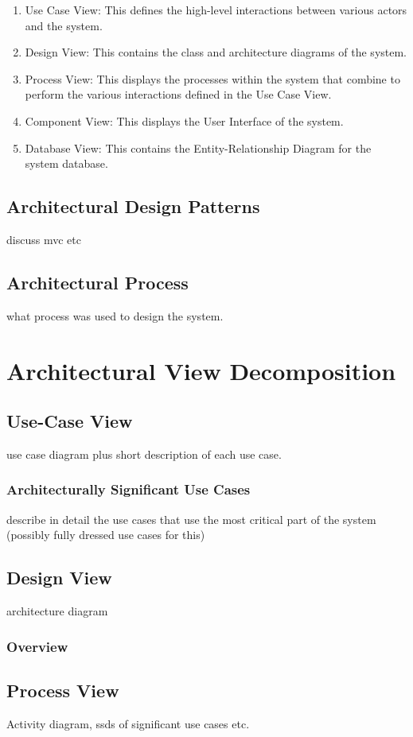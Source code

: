 \documentclass[11pt]{article}
\begin{document}
\begin{enumerate}
	\item Use Case View: This defines the high-level interactions between various actors and the system.
	\item Design View: This contains the class and architecture diagrams of the system.
	\item Process View: This displays the processes within the system that combine to perform the various interactions defined in the Use Case View.
	\item Component View: This displays the User Interface of the system.
	\item Database View: This contains the Entity-Relationship Diagram for the system database.
\end{enumerate} 
\subsection{Architectural Design Patterns}
discuss mvc etc
\subsection{Architectural Process}
what process was used to design the system.
\section{Architectural View Decomposition}
\subsection{Use-Case View}
use case diagram plus short description of each use case.
\subsubsection{Architecturally Significant Use Cases}
describe in detail the use cases that use the most critical part of the system (possibly fully dressed use cases for this)
\subsection{Design View}
architecture diagram
\subsubsection{Overview}
\subsection{Process View}
Activity diagram, ssds of significant use cases etc.
\end{document}
